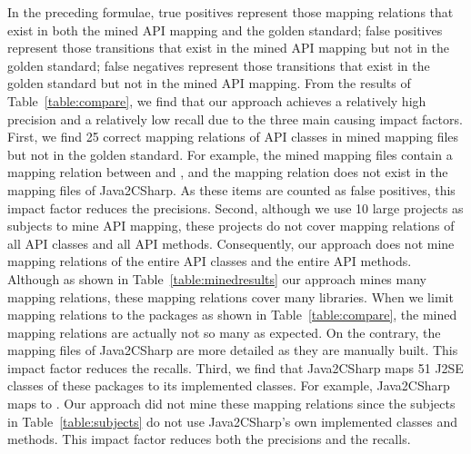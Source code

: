 In the preceding formulae, true positives represent those mapping
relations that exist in both the mined API mapping and the golden
standard; false positives represent those transitions that exist in
the mined API mapping but not in the golden standard; false
negatives represent those transitions that exist in the golden
standard but not in the mined API mapping. From the results of
Table~\ref{table:compare}, we find that our approach achieves a
relatively high precision and a relatively low recall due to the
three main causing impact factors. First, we find 25 correct mapping
relations of API classes in mined mapping files but not in the
golden standard. For example, the mined mapping files contain a
mapping relation between  and
, and the mapping relation does not
exist in the mapping files of Java2CSharp. As these items are
counted as false positives, this impact factor reduces the
precisions. Second, although we use 10 large projects as subjects to
mine API mapping, these projects do not cover mapping relations of
all API classes and all API methods. Consequently, our approach does
not mine mapping relations of the entire API classes and the entire
API methods. Although as shown in Table~\ref{table:minedresults} our
approach mines many mapping relations, these mapping relations cover
many libraries. When we limit mapping relations to the packages as
shown in Table~\ref{table:compare}, the mined mapping relations are
actually not so many as expected. On the contrary, the mapping files
of Java2CSharp are more detailed as they are manually built. This
impact factor reduces the recalls. Third, we find that Java2CSharp
maps 51 J2SE classes of these packages to its implemented classes.
For example, Java2CSharp maps  to
. Our approach did not
mine these mapping relations since the subjects in
Table~\ref{table:subjects} do not use Java2CSharp's own implemented
classes and methods. This impact factor reduces both the precisions
and the recalls.

